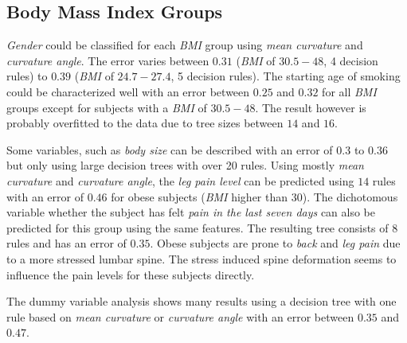 \documentclass[a4paper,twoside]{style/article}
\newcommand{\com}[1]{\textcolor{orange}{\uline{#1}}}
\begin{document}
\subsection{Body Mass Index Groups}
\emph{Gender} could be classified for each \emph{BMI} group using \emph{mean curvature} and \emph{curvature angle}.
The error varies between $0.31$ (\emph{BMI} of \emph{$30.5-48$}, 4 decision rules) to $0.39$ (\emph{BMI} of \emph{$24.7-27.4$}, 5 decision rules).
The starting age of smoking could be characterized well with an error between $0.25$ and $0.32$ for all \emph{BMI} groups except for subjects with a \emph{BMI} of \emph{$30.5-48$}.
The result however is probably overfitted to the data due to tree sizes between $14$ and $16$.

Some variables, such as \emph{body size} can be described with an error of $0.3$ to $0.36$ but only using large decision trees with over 20 rules.
Using mostly \emph{mean curvature} and \emph{curvature angle}, the \emph{leg pain level} can be predicted using $14$ rules with an error of $0.46$ for obese subjects (\emph{BMI} higher than $30$).
The dichotomous variable whether the subject has felt \emph{pain in the last seven days} can also be predicted for this group using the same features.
The resulting tree consists of $8$ rules and has an error of $0.35$.
Obese subjects are prone to \emph{back} and \emph{leg pain} due to a more stressed lumbar spine.
The stress induced spine deformation seems to influence the pain levels for these subjects directly.

The dummy variable analysis shows many results using a decision tree with one rule based on \emph{mean curvature} or \emph{curvature angle} with an error between $0.35$ and $0.47$.
\end{document}
